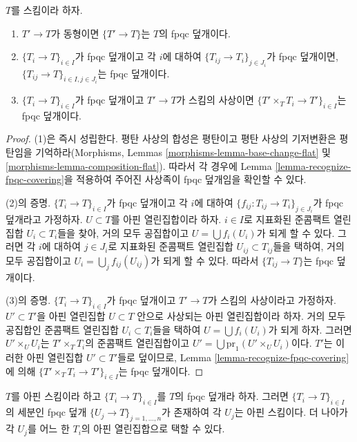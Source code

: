 \begin{lemma}
\label{lemma-fpqc}
$T$를 스킴이라 하자.
\begin{enumerate}
\item $T' \to T$가 동형이면 $\{T' \to T\}$는 $T$의 fpqc 덮개이다.
\item $\{T_i \to T\}_{i\in I}$가 fpqc 덮개이고 각 $i$에 대하여
$\{T_{ij} \to T_i\}_{j\in J_i}$가 fpqc 덮개이면,
$\{T_{ij} \to T\}_{i \in I, j\in J_i}$는 fpqc 덮개이다.
\item $\{T_i \to T\}_{i\in I}$가 fpqc 덮개이고 $T' \to T$가 스킴의
사상이면 $\{T' \times_T T_i \to T'\}_{i\in I}$는 fpqc 덮개이다.
\end{enumerate}
\end{lemma}

\begin{proof}
(1)은 즉시 성립한다. 평탄 사상의 합성은 평탄이고 평탄 사상의 기저변환은
평탄임을 기억하라(Morphisms, Lemmas
\ref{morphisms-lemma-base-change-flat} 및
\ref{morphisms-lemma-composition-flat}). 따라서 각 경우에 Lemma
\ref{lemma-recognize-fpqc-covering}을 적용하여 주어진 사상족이 fpqc
덮개임을 확인할 수 있다.

\medskip\noindent
(2)의 증명. $\{T_i \to T\}_{i\in I}$가 fpqc 덮개이고 각 $i$에 대하여
$\{f_{ij} : T_{ij} \to T_i\}_{j\in J_i}$가 fpqc 덮개라고 가정하자.
$U \subset T$를 아핀 열린집합이라 하자. $i \in I$로 지표화된 준콤팩트
열린집합 $U_i \subset T_i$들을 찾아, 거의 모두 공집합이고
$U = \bigcup f_i(U_i)$가 되게 할 수 있다. 그러면 각 $i$에 대하여
$j \in J_i$로 지표화된 준콤팩트 열린집합 $U_{ij} \subset T_{ij}$들을
택하여, 거의 모두 공집합이고 $U_i = \bigcup_j f_{ij}(U_{ij})$가 되게 할
수 있다. 따라서 $\{T_{ij} \to T\}$는 fpqc 덮개이다.

\medskip\noindent
(3)의 증명. $\{T_i \to T\}_{i\in I}$가 fpqc 덮개이고 $T' \to T$가 스킴의
사상이라고 가정하자. $U' \subset T'$을 아핀 열린집합
$U \subset T$ 안으로 사상되는 아핀 열린집합이라 하자. 거의 모두 공집합인
준콤팩트 열린집합 $U_i \subset T_i$들을 택하여
$U = \bigcup f_i(U_i)$가 되게 하자. 그러면 $U' \times_U U_i$는
$T' \times_T T_i$의 준콤팩트 열린집합이고
$U' = \bigcup \text{pr}_1(U' \times_U U_i)$이다. $T'$는 이러한 아핀
열린집합 $U' \subset T'$들로 덮이므로, Lemma
\ref{lemma-recognize-fpqc-covering}에 의해
$\{T' \times_T T_i \to T'\}_{i\in I}$는 fpqc 덮개이다.
\end{proof}

\begin{lemma}
\label{lemma-fpqc-affine}
$T$를 아핀 스킴이라 하고 $\{T_i \to T\}_{i \in I}$를 $T$의 fpqc
덮개라 하자. 그러면 $\{T_i \to T\}_{i \in I}$의 세분인 fpqc 덮개
$\{U_j \to T\}_{j = 1, \ldots, n}$가 존재하여 각 $U_j$는 아핀 스킴이다.
더 나아가 각 $U_j$를 어느 한 $T_i$의 아핀 열린집합으로 택할 수 있다.
\end{lemma}

